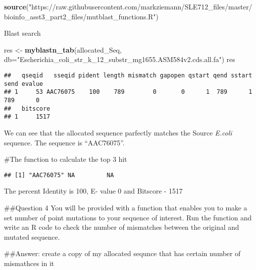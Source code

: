 \documentclass[]{article}
\newenvironment{Shaded}{\begin{snugshade}}{\end{snugshade}}
\newcommand{\DataTypeTok}[1]{\textcolor[rgb]{0.13,0.29,0.53}{#1}}
\newcommand{\DecValTok}[1]{\textcolor[rgb]{0.00,0.00,0.81}{#1}}
\newcommand{\KeywordTok}[1]{\textcolor[rgb]{0.13,0.29,0.53}{\textbf{#1}}}
\newcommand{\NormalTok}[1]{#1}
\newcommand{\OperatorTok}[1]{\textcolor[rgb]{0.81,0.36,0.00}{\textbf{#1}}}
\newcommand{\StringTok}[1]{\textcolor[rgb]{0.31,0.60,0.02}{#1}}
\begin{document}
\begin{Shaded}
\begin{Highlighting}[]
\KeywordTok{source}\NormalTok{(}\StringTok{"https://raw.githubusercontent.com/markziemann/SLE712_files/master/bioinfo_asst3_part2_files/mutblast_functions.R"}\NormalTok{)}
\end{Highlighting}
\end{Shaded}

Blast search

\begin{Shaded}
\begin{Highlighting}[]
\NormalTok{res <-}\StringTok{ }\KeywordTok{myblastn_tab}\NormalTok{(allocated_Seq, }\DataTypeTok{db=}\StringTok{"Escherichia_coli_str_k_12_substr_mg1655.ASM584v2.cds.all.fa"}\NormalTok{)}
\NormalTok{res}
\end{Highlighting}
\end{Shaded}

\begin{verbatim}
##   qseqid   sseqid pident length mismatch gapopen qstart qend sstart send evalue
## 1     53 AAC76075    100    789        0       0      1  789      1  789      0
##   bitscore
## 1     1517
\end{verbatim}

We can see that the allocated sequence parfectly matches the Source
\emph{E.coli} sequence. The sequence is ``AAC76075''.

\#The function to calculate the top 3 hit

\begin{Shaded}
\end{Shaded}

\begin{verbatim}
## [1] "AAC76075" NA         NA
\end{verbatim}

The percent Identity is 100, E- value 0 and Bitscore - 1517

\#\#Question 4 You will be provided with a function that enables you to
make a set number of point mutations to your sequence of interest. Run
the function and write an R code to check the number of mismatches
between the original and mutated sequence.

\#\#Answer: create a copy of my allocated sequnce that has certain
number of mismathces in it
\end{document}
